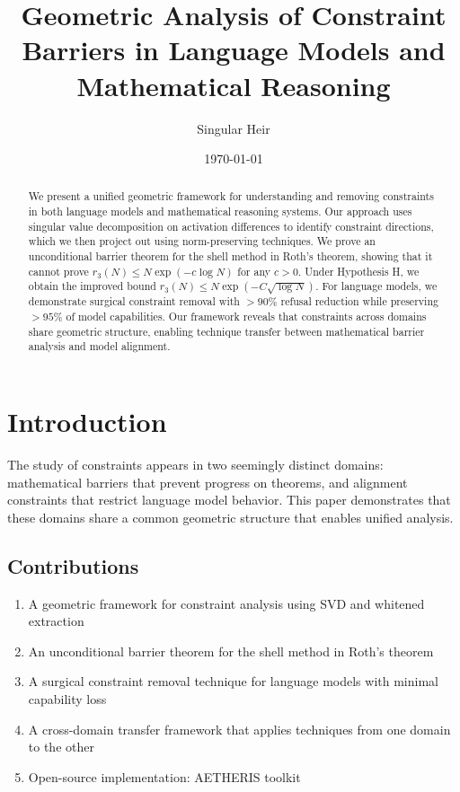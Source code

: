\documentclass[11pt]{article}
\title{Geometric Analysis of Constraint Barriers in Language Models and Mathematical Reasoning}
\author{Singular Heir}
\date{\today}
\begin{document}
\maketitle

\begin{abstract}
We present a unified geometric framework for understanding and removing constraints in both language models and mathematical reasoning systems. Our approach uses singular value decomposition on activation differences to identify constraint directions, which we then project out using norm-preserving techniques. We prove an unconditional barrier theorem for the shell method in Roth's theorem, showing that it cannot prove $r_3(N) \le N \exp(-c\log N)$ for any $c>0$. Under Hypothesis H, we obtain the improved bound $r_3(N) \le N \exp(-C\sqrt{\log N})$. For language models, we demonstrate surgical constraint removal with $>90\%$ refusal reduction while preserving $>95\%$ of model capabilities. Our framework reveals that constraints across domains share geometric structure, enabling technique transfer between mathematical barrier analysis and model alignment.
\end{abstract}

\section{Introduction}

The study of constraints appears in two seemingly distinct domains: mathematical barriers that prevent progress on theorems, and alignment constraints that restrict language model behavior. This paper demonstrates that these domains share a common geometric structure that enables unified analysis.

\subsection{Contributions}

\begin{enumerate}
    \item A geometric framework for constraint analysis using SVD and whitened extraction
    \item An unconditional barrier theorem for the shell method in Roth's theorem
    \item A surgical constraint removal technique for language models with minimal capability loss
    \item A cross-domain transfer framework that applies techniques from one domain to the other
    \item Open-source implementation: AETHERIS toolkit
\end{enumerate}
\end{document}
